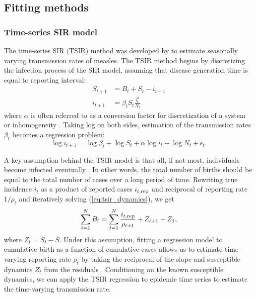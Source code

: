 \documentclass{article}
\newcommand{\eref}[1]{(\ref{eq:#1})}
\begin{document}
\subsection{Fitting methods}

\subsubsection*{Time-series SIR model}

The time-series SIR (TSIR) method was developed by \cite{finkenstadt2000time} to estimate seasonally varying transmission rates of measles.
The TSIR method begins by discretizing the infection process of the SIR model, assuming that disease generation time is equal to reporting interval:
\begin{equation}\label{eq:tsir_dynamics}
\begin{aligned}
S_{t+1} &= B_t + S_t - i_{t+1}\\
i_{t+1} &= \beta_t S_t \frac{i_t^\alpha}{N_t}
\end{aligned}
\end{equation}
where $\alpha$ is often referred to as a conversion factor for discretization of a system or inhomogeneity \citep{liu1986influence, bjornstad2002dynamics, glass2003interpreting}.
Taking log on both sides, estimation of the transmission rates $\beta_t$ becomes a regression problem:
\begin{equation}\label{eq:tsir}
\log i_{t + 1} = \log \beta_t + \log S_t + \alpha \log i_t - \log N_t + \epsilon_t.
\end{equation}

A key assumption behind the TSIR model is that all, if not most, individuals become infected eventually \citep{finkenstadt2000time}.
In other words, the total number of births should be equal to the total number of cases over a long period of time.
Rewriting true incidence $i_t$ as a product of reported cases $i_{t, {\tiny \textrm{rep}}}$ and reciprocal of reporting rate $1/\rho_t$ and iteratively solving \eref{tsir_dynamics}, we get
\begin{equation}
\sum_{t=1}^N B_t = \sum_{t=1}^N \frac{i_{t, {\tiny \textrm{rep}}}}{\rho_{t+1}} + Z_{t+1} - Z_1,
\end{equation}
where $Z_t = S_t - \bar{S}$.
Under this assumption, fitting a regression model to cumulative birth as a function of cumulative cases allows us to estimate time-varying reporting rate $\rho_t$ by taking the reciprocal of the slope and susceptible dynamics $Z_t$ from the residuals \citep{finkenstadt2000time}.
Conditioning on the known susceptible dynamics, we can apply the TSIR regression \label{eq:tsir} to epidemic time series to estimate the time-varying transmission rate.
\end{document}

